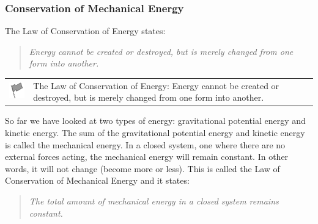             \subsubsection{ Conservation of Mechanical Energy}
            \nopagebreak
            
        
        \label{m38786*id68454}The Law of Conservation of Energy states:\par 
        \label{m38786*id68458}
          \label{m38786*id68458!!!underscore!!!quote}\begin{quote}{\sl Energy cannot be created or destroyed, but is merely changed from one form into another.} %
    \end{quote}
    
        \par 
\label{m38786*fhsst!!!underscore!!!id1579}\begin{definition}
	  \begin{tabular*}{15 cm}{m{15 mm}m{}}
	\hspace*{-50pt}  \includegraphics[width=0.5in]{col11305.imgs/psflag2.png}   & \Definition{   \label{id2556212}\textbf{ Conservation of Energy }} { \label{m38786*meaningfhsst!!!underscore!!!id1579}
        \label{m38786*id68470}The Law of Conservation of Energy: Energy cannot be created or destroyed, but is merely changed from one form into another. \par 
         } 
      \end{tabular*}
      \end{definition}

        \label{m38786*id68483}So far we have looked at two types of energy: gravitational potential energy and kinetic energy. The sum of the gravitational potential energy and kinetic energy is called the mechanical energy. In a closed system, one where there are no external forces acting, the mechanical energy will remain constant. In other words, it will not change (become more or less). This is called the Law of Conservation of Mechanical Energy and it states:\par 
        \label{m38786*id68494}
          \label{m38786*id68494!!!underscore!!!quote}\begin{quote}{\sl The total amount of mechanical energy in a closed system remains constant.} %
    \end{quote}
    
